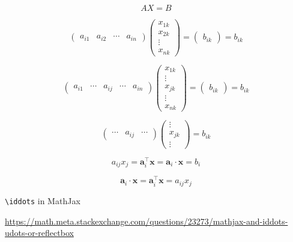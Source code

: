 \documentclass[
]{book}
\theoremstyle{definition}
\theoremstyle{definition}
\theoremstyle{definition}
\theoremstyle{definition}
\theoremstyle{remark}
\begin{document}
\[
AX=B
\]

\[
\begin{pmatrix}a_{{\scriptscriptstyle i1}} & a_{{\scriptscriptstyle i2}} & \cdots & a_{{\scriptscriptstyle in}}\end{pmatrix}\begin{pmatrix}x_{{\scriptscriptstyle 1k}}\\
x_{{\scriptscriptstyle 2k}}\\
\vdots\\
x_{{\scriptscriptstyle nk}}
\end{pmatrix}=\begin{pmatrix}b_{{\scriptscriptstyle ik}}\end{pmatrix}=b_{{\scriptscriptstyle ik}}
\]

\[
\begin{pmatrix}a_{{\scriptscriptstyle i1}} & \cdots & a_{{\scriptscriptstyle ij}} & \cdots & a_{{\scriptscriptstyle in}}\end{pmatrix}\begin{pmatrix}x_{{\scriptscriptstyle 1k}}\\
\vdots\\
x_{{\scriptscriptstyle jk}}\\
\vdots\\
x_{{\scriptscriptstyle nk}}
\end{pmatrix}=\begin{pmatrix}b_{{\scriptscriptstyle ik}}\end{pmatrix}=b_{{\scriptscriptstyle ik}}
\]

\[
\begin{pmatrix}\cdots & a_{{\scriptscriptstyle ij}} & \cdots\end{pmatrix}\begin{pmatrix}\vdots\\
x_{{\scriptscriptstyle jk}}\\
\vdots
\end{pmatrix}=b_{{\scriptscriptstyle ik}}
\]

\[
a_{{\scriptscriptstyle ij}}x_{{\scriptscriptstyle j}}=\boldsymbol{a}_{{\scriptscriptstyle i}}^{\intercal}\boldsymbol{x}=\boldsymbol{a}_{{\scriptscriptstyle i}}\cdot\boldsymbol{x}=b_{i}
\]

\[
\boldsymbol{a}_{{\scriptscriptstyle i}}\cdot\boldsymbol{x}=\boldsymbol{a}_{{\scriptscriptstyle i}}^{\intercal}\boldsymbol{x}=a_{{\scriptscriptstyle ij}}x_{{\scriptscriptstyle j}}
\]

\texttt{\textbackslash{}iddots} in MathJax

\url{https://math.meta.stackexchange.com/questions/23273/mathjax-and-iddots-udots-or-reflectbox}
\end{document}
